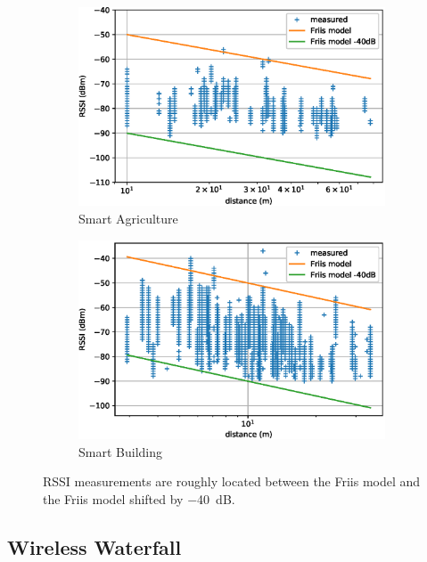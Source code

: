 \documentclass{elsarticle}
\newcommand{\building}            {Smart Building\xspace}
\newcommand{\agri}                {Smart Agriculture\xspace}
\begin{document}
\begin{figure}[h]
    \centering
    \begin{subfigure}[h]{0.49\textwidth}
        \includegraphics[width=\textwidth]{pister_hack_agri.eps}
        \caption{\agri}
    \end{subfigure}
    \begin{subfigure}[h]{0.49\textwidth}  
        \includegraphics[width=\textwidth]{pister_hack_building.eps}
        \caption{\building}
    \end{subfigure} 
    \caption{RSSI measurements are roughly located between the Friis model and the Friis model shifted by $-$40~dB.}
    \label{fig:pister_hack}
\end{figure}

\subsection{Wireless Waterfall}
\label{sec:waterfall}
\end{document}
